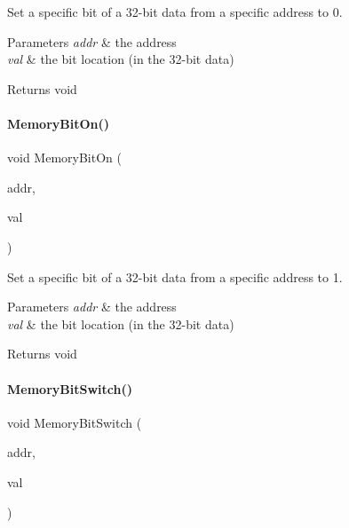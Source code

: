 Set a specific bit of a 32-\/bit data from a specific address to 0. 


\begin{DoxyParams}{Parameters}
{\em addr} & the address \\
\hline
{\em val} & the bit location (in the 32-\/bit data) \\
\hline
\end{DoxyParams}
\begin{DoxyReturn}{Returns}
void 
\end{DoxyReturn}
\mbox{\label{a00020_a23e80593caa37b5d932a8320dc561830}} 
\paragraph{\texorpdfstring{Memory\+Bit\+On()}{MemoryBitOn()}}
{\footnotesize\ttfamily void Memory\+Bit\+On (\begin{DoxyParamCaption}\item[{\mbox{\hyperlink{a00020_a06da901348542a481c297d9b700e2001}{memory\+\_\+addr\+\_\+t}}}]{addr,  }\item[{uint32\+\_\+t}]{val }\end{DoxyParamCaption})\hspace{0.3cm}{\ttfamily [inline]}}



Set a specific bit of a 32-\/bit data from a specific address to 1. 


\begin{DoxyParams}{Parameters}
{\em addr} & the address \\
\hline
{\em val} & the bit location (in the 32-\/bit data) \\
\hline
\end{DoxyParams}
\begin{DoxyReturn}{Returns}
void 
\end{DoxyReturn}
\mbox{\label{a00020_a7a3766694541dd5c639d4a11897aaeb9}} 
\paragraph{\texorpdfstring{Memory\+Bit\+Switch()}{MemoryBitSwitch()}}
{\footnotesize\ttfamily void Memory\+Bit\+Switch (\begin{DoxyParamCaption}\item[{\mbox{\hyperlink{a00020_a06da901348542a481c297d9b700e2001}{memory\+\_\+addr\+\_\+t}}}]{addr,  }\item[{uint32\+\_\+t}]{val }\end{DoxyParamCaption})\hspace{0.3cm}{\ttfamily [inline]}}




